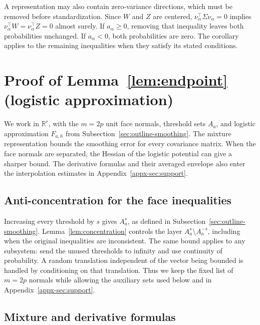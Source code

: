 \documentclass[11pt,letterpaper]{article}
\theoremstyle{remark}
\newcommand{\R}{\mathbb R}
\begin{document}
A representation may also contain zero-variance directions, which
must be removed before standardization. Since \(W\) and \(Z\) are centered,
\(\nu_\alpha^\top\Sigma\nu_\alpha=0\) implies
\(\nu_\alpha^\top W=\nu_\alpha^\top Z=0\) almost surely.
If \(a_\alpha\ge0\), removing that inequality leaves both
probabilities unchanged. If \(a_\alpha<0\), both probabilities
are zero. The corollary applies to the remaining inequalities when
they satisfy its stated conditions.

\section{Proof of Lemma~\ref*{lem:endpoint} (logistic approximation)}\label{appx-sec:smoothing}

We work in \(\R^r\), with the \(m=2p\) unit face normals,
threshold sets \(A_a\), and logistic approximation \(F_{a,h}\) from
Subsection~\ref{sec:outline-smoothing}. The mixture representation
bounds the smoothing error for every covariance matrix. When the
face normals are separated, the Hessian of the logistic potential
can give a sharper bound. The derivative formulas and their averaged
envelope also enter the interpolation estimates in
Appendix~\ref{appx-sec:support}.

\subsection{Anti-concentration for the face inequalities}

Increasing every threshold by \(s\) gives \(A_a^s\), as defined
in Subsection~\ref{sec:outline-smoothing}. Lemma~\ref{lem:concentration}
controls the layer \(A_a^s\setminus A_a^{-s}\), including when
the original inequalities are inconsistent. The same bound applies
to any subsystem: send the unused thresholds to infinity and use
continuity of probability. A random translation independent of the vector being bounded is
handled by conditioning on that translation. Thus we keep the fixed
list of \(m=2p\) normals while allowing the auxiliary sets used
below and in Appendix~\ref{appx-sec:support}.

\subsection{\texorpdfstring{Mixture and derivative formulas}{Mixture and derivative formulas}}\label{appx-sec:mixture}
\end{document}
